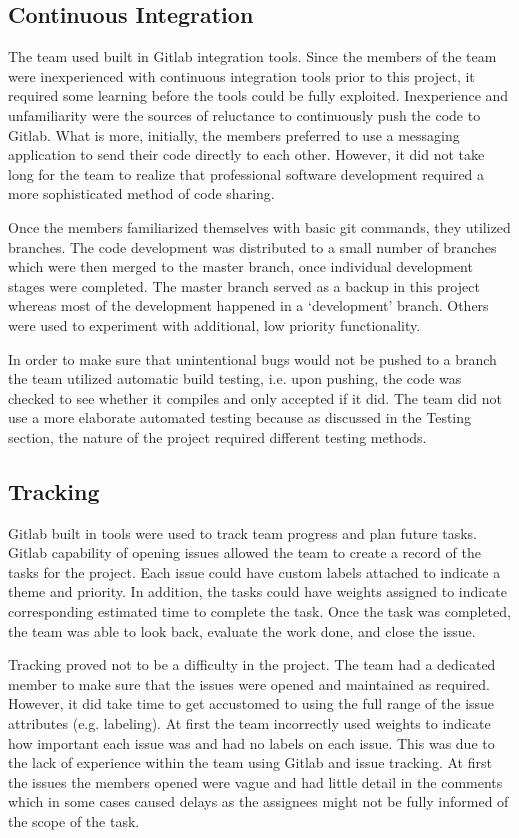 \documentclass{l3proj}
\begin{document}
\subsection{Continuous Integration}
The team used built in Gitlab integration tools. Since the members of the team were inexperienced with continuous integration tools prior to this project, it required some learning before the tools could be fully exploited. Inexperience and unfamiliarity were the sources of reluctance to continuously push the code to Gitlab. What is more, initially, the members preferred to use a messaging application to send their code directly to each other. However, it did not take long for the team to realize that professional software development required a more sophisticated method of code sharing.

Once the members familiarized themselves with basic git commands, they utilized branches. The code development was distributed to a small number of branches which were then merged to the master branch, once individual development stages were completed. The master branch served as a backup in this project whereas most of the development happened in a ‘development' branch. Others were used to experiment with additional, low priority functionality.

In order to make sure that unintentional bugs would not be pushed to a branch the team utilized automatic build testing, i.e. upon pushing, the code was checked to see whether it compiles and only accepted if it did. The team did not use a more elaborate automated testing because as discussed in the Testing section, the nature of the project required different testing methods.

\subsection{Tracking}
Gitlab built in tools were used to track team progress and plan future tasks. Gitlab capability of opening issues allowed the team to create a record of the tasks for the project. Each issue could have custom labels attached to indicate a theme and priority. In addition, the tasks could have weights assigned to indicate corresponding estimated time to complete the task. Once the task was completed, the team was able to look back, evaluate the work done, and close the issue.

Tracking proved not to be a difficulty in the project. The team had a dedicated member to make sure that the issues were opened and maintained as required. However, it did take time to get accustomed to using the full range of the issue attributes (e.g. labeling). At first the team incorrectly used weights to indicate how important each issue was and had no labels on each issue. This was due to the lack of experience within the team using Gitlab and issue tracking. At first the issues the members opened were vague and had little detail in the comments which in some cases caused delays as the assignees might not be fully informed of the scope of the task.
 
\end{document}
